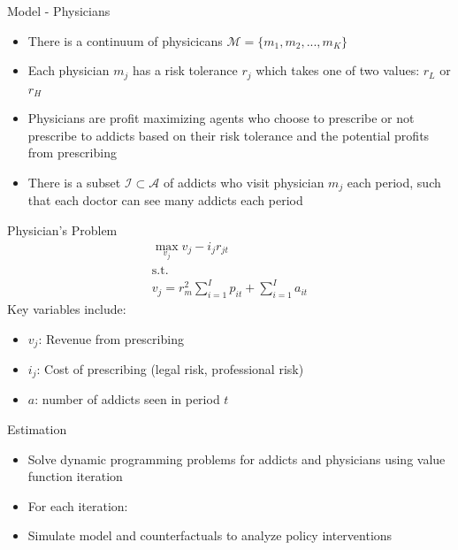 \documentclass[aspectratio=169,professionalfonts]{beamer}
\begin{document}
  \begin{frame}{Model - Physicians}
    \begin{itemize}
      \item There is a continuum of physicicans $\mathcal{M} = \{m_1, m_2, ..., m_K\}$
      \item Each physician $m_j$ has a risk tolerance $r_j$ which takes one of two values: $r_L$ or $r_H$
      \item Physicians are profit maximizing agents who choose to prescribe or not prescribe to addicts based on their risk tolerance and the potential profits from prescribing
      \item There is a subset $\mathcal{I}\subset\mathcal{A}$ of addicts who visit physician $m_j$ each period, such that each doctor can see many addicts each period
    \end{itemize}
  \end{frame}

  \begin{frame}{Physician's Problem}
    \begin{gather*}
      \max_{v_j} v_j - i_jr_{jt} \\
      \text{s.t.} \\
      v_j = r_m^2\sum_{i = 1}^{I}p_{it} + \sum_{i=1}^{I} a_{it}
    \end{gather*}
    Key variables include:
    \begin{itemize}
      \item $v_j$: Revenue from prescribing
      \item $i_j$: Cost of prescribing (legal risk, professional risk)
      \item $a$: number of addicts seen in period $t$
      \end{itemize}
  \end{frame}

  \begin{frame}{Estimation}
    \begin{itemize}
      \item Solve dynamic programming problems for addicts and physicians using value function iteration
      \item For each iteration:
      \item Simulate model and counterfactuals to analyze policy interventions
    \end{itemize}
  \end{frame}
\end{document}
